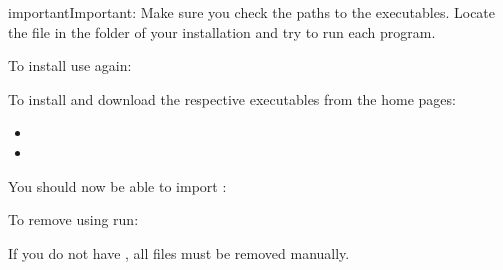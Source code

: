 \documentclass[letterpaper,10pt,english]{sphinxmanual}
\begin{document}
\begin{sphinxadmonition}{important}{Important:}
Make sure you check the paths to the executables. Locate the file  in the  folder of your installation and
try to run each program.
\end{sphinxadmonition}

To install  use  again:

\begin{sphinxVerbatim}[commandchars=\\\{\}]
\PYGZbs{}   
\end{sphinxVerbatim}

To install  and  download the respective executables from the home pages:
\begin{itemize}
\item {} 

\item {} 

\end{itemize}

You should now be able to import :

\begin{sphinxVerbatim}[commandchars=\\\{\}]
\PYGZbs{} 
  
\end{sphinxVerbatim}

To remove  using  run:

\begin{sphinxVerbatim}[commandchars=\\\{\}]
\PYGZbs{}   
\end{sphinxVerbatim}

If you do not have , all files must be removed manually.
\end{document}
